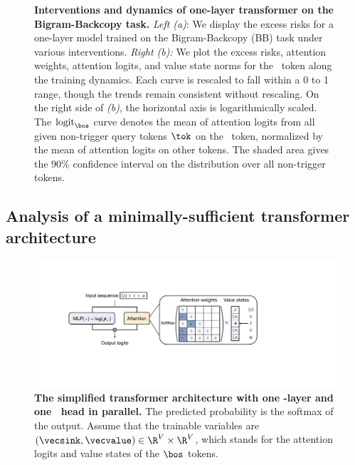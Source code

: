 \begin{figure}
    \caption{\small \textbf{Interventions and dynamics of one-layer transformer on the Bigram-Backcopy task.}  \textit{Left (a)}: We display the excess risks for a one-layer model trained on the Bigram-Backcopy (BB) task under various interventions. \textit{Right (b):} We plot the excess risks, attention weights, attention logits, and value state norms for the \bos~token along the training dynamics. Each curve is rescaled to fall within a 0 to 1 range, though the trends remain consistent without rescaling. On the right side of \textit{(b)}, the horizontal axis is logarithmically scaled. The $\text{logit}_{\bos}$ curve denotes the mean of attention logits from all given non-trigger query tokens $\tok$ on the \bos~token, normalized by the mean of attention logits on other tokens. The shaded area gives the 90\% confidence interval on the distribution over all non-trigger tokens.}
    \label{figure:verify-assumptions}
\end{figure}

\subsection{Analysis of a minimally-sufficient transformer architecture}

\begin{figure}[t]
    \centering
    \includegraphics[width=0.8\linewidth]{Figures/BBM/SimpleModel.pdf}
    \caption{\small \textbf{The simplified transformer architecture with one \mlp-layer and one \attn~head in parallel.} The predicted probability is the softmax of the output. Assume that the trainable variables are $(\vecsink,\vecvalue) \in \R^V \times \R^V$, which stands for the attention logits and value states of the $\bos$ tokens.}
    \label{figure:simple-model}
\end{figure}

